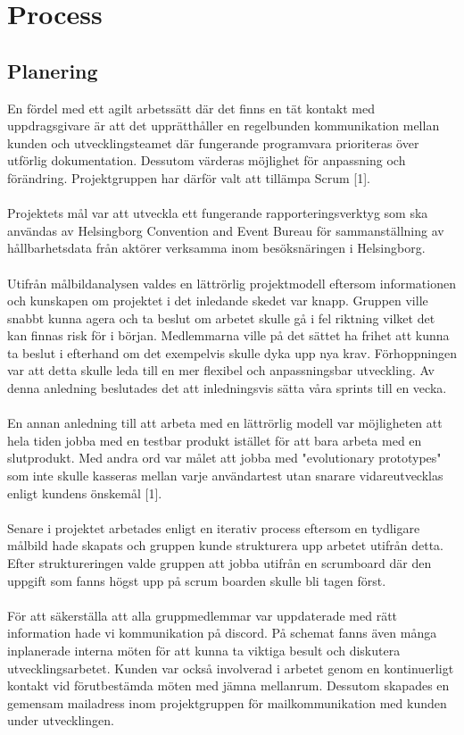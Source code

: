 \documentclass[12pt]{article}
\begin{document}
\section{Process}

\subsection{Planering}
En fördel med ett agilt arbetssätt där det finns en tät kontakt med uppdragsgivare är att det upprätthåller en regelbunden kommunikation mellan kunden och utvecklingsteamet där fungerande programvara prioriteras över utförlig dokumentation. Dessutom värderas möjlighet för anpassning och förändring. Projektgruppen har därför valt att tillämpa Scrum [1].  \\\\
Projektets mål var att utveckla ett fungerande rapporteringsverktyg som ska användas av Helsingborg Convention and Event Bureau för sammanställning av \\ hållbarhetsdata från aktörer verksamma inom besöksnäringen i Helsingborg. \\\\
Utifrån målbildanalysen valdes en lättrörlig projektmodell eftersom informationen och kunskapen om projektet i det inledande skedet var knapp. Gruppen ville snabbt kunna agera och ta beslut om arbetet skulle gå i fel riktning vilket det kan finnas risk för i början. Medlemmarna ville på det sättet ha frihet att kunna ta beslut i efterhand om det exempelvis skulle dyka upp nya krav. Förhoppningen var att detta skulle leda till en mer flexibel och anpassningsbar utveckling. Av denna anledning beslutades det att inledningsvis sätta våra sprints till en vecka. \\\\ 
En annan anledning till att arbeta med en lättrörlig modell var möjligheten att hela tiden jobba med en testbar produkt istället för att bara arbeta med en slutprodukt. Med andra ord var målet att jobba med "evolutionary prototypes" som inte skulle kasseras mellan varje användartest utan snarare vidareutvecklas enligt kundens önskemål [1].\\\\
Senare i projektet arbetades enligt en iterativ process eftersom en tydligare målbild hade skapats och gruppen kunde strukturera upp arbetet utifrån detta. Efter struktureringen valde gruppen att jobba utifrån en scrumboard där den uppgift som fanns högst upp på scrum boarden skulle bli tagen först. \\\\
För att säkerställa att alla gruppmedlemmar var uppdaterade med rätt information hade vi kommunikation på discord. På schemat fanns även många inplanerade interna möten för att kunna ta viktiga besult och diskutera utvecklingsarbetet. Kunden var också involverad i arbetet genom en kontinuerligt kontakt vid förutbestämda möten med jämna mellanrum. Dessutom skapades en gemensam mailadress inom projektgruppen för mailkommunikation med kunden under utvecklingen.\\\\
\end{document}

